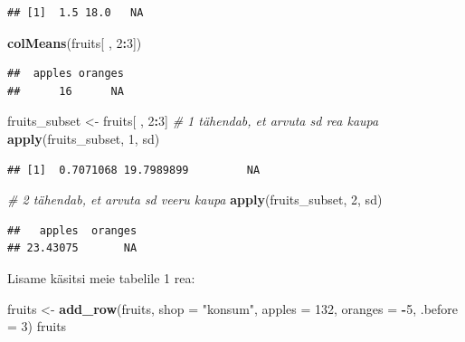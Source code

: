 \documentclass[]{book}
\newenvironment{Shaded}{\begin{snugshade}}{\end{snugshade}}
\newcommand{\KeywordTok}[1]{\textcolor[rgb]{0.13,0.29,0.53}{\textbf{#1}}}
\newcommand{\DataTypeTok}[1]{\textcolor[rgb]{0.13,0.29,0.53}{#1}}
\newcommand{\DecValTok}[1]{\textcolor[rgb]{0.00,0.00,0.81}{#1}}
\newcommand{\StringTok}[1]{\textcolor[rgb]{0.31,0.60,0.02}{#1}}
\newcommand{\CommentTok}[1]{\textcolor[rgb]{0.56,0.35,0.01}{\textit{#1}}}
\newcommand{\OperatorTok}[1]{\textcolor[rgb]{0.81,0.36,0.00}{\textbf{#1}}}
\newcommand{\NormalTok}[1]{#1}
\begin{document}
\begin{verbatim}
## [1]  1.5 18.0   NA
\end{verbatim}

\begin{Shaded}
\begin{Highlighting}[]
\KeywordTok{colMeans}\NormalTok{(fruits[ , }\DecValTok{2}\OperatorTok{:}\DecValTok{3}\NormalTok{])}
\end{Highlighting}
\end{Shaded}

\begin{verbatim}
##  apples oranges 
##      16      NA
\end{verbatim}

\begin{Shaded}
\begin{Highlighting}[]
\NormalTok{fruits_subset <-}\StringTok{ }\NormalTok{fruits[ , }\DecValTok{2}\OperatorTok{:}\DecValTok{3}\NormalTok{]}
\CommentTok{# 1 tähendab, et arvuta sd rea kaupa}
\KeywordTok{apply}\NormalTok{(fruits_subset, }\DecValTok{1}\NormalTok{, sd)}
\end{Highlighting}
\end{Shaded}

\begin{verbatim}
## [1]  0.7071068 19.7989899         NA
\end{verbatim}

\begin{Shaded}
\begin{Highlighting}[]
\CommentTok{# 2 tähendab, et arvuta sd veeru kaupa}
\KeywordTok{apply}\NormalTok{(fruits_subset, }\DecValTok{2}\NormalTok{, sd) }
\end{Highlighting}
\end{Shaded}

\begin{verbatim}
##   apples  oranges 
## 23.43075       NA
\end{verbatim}

Lisame käsitsi meie tabelile 1 rea:

\begin{Shaded}
\begin{Highlighting}[]
\NormalTok{fruits <-}\StringTok{ }\KeywordTok{add_row}\NormalTok{(fruits, }
                  \DataTypeTok{shop =} \StringTok{"konsum"}\NormalTok{, }
                  \DataTypeTok{apples =} \DecValTok{132}\NormalTok{, }
                  \DataTypeTok{oranges =} \OperatorTok{-}\DecValTok{5}\NormalTok{, }
                  \DataTypeTok{.before =} \DecValTok{3}\NormalTok{)}
\NormalTok{fruits}
\end{Highlighting}
\end{Shaded}
\end{document}
